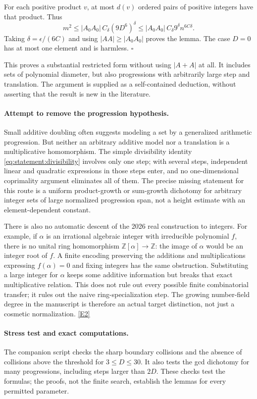 \documentclass[11pt,a4paper]{article}
\newcommand{\Z}{\mathbb{Z}}
\newcommand{\eref}[2]{\hyperlink{extra:#1:#2}{[E#2]}}
\numberwithin{equation}{section}
\begin{document}
For each positive product $v$, at most $d(v)$ ordered pairs of positive
integers have that product. Thus
\[
 m^2\leq |A_0A_0|\,C_\delta(9D^6)^\delta
 \leq |A_0A_0|\,C_\delta9^\delta n^{6C\delta}.
\]
Taking $\delta=\epsilon/(6C)$ and using $|AA|\geq|A_0A_0|$ proves the
lemma. The case $D=0$ has at most one element and is harmless. $\square$

This proves a substantial restricted form without using $|A+A|$ at all.
It includes sets of polynomial diameter, but also progressions with
arbitrarily large step and translation. The argument is supplied as a
self-contained deduction, without asserting that the result is new in
the literature.

\paragraph{Attempt to remove the progression hypothesis.}
Small additive doubling often suggests modeling a set by a generalized
arithmetic progression. But neither an arbitrary additive model nor a
translation is a multiplicative homomorphism. The simple divisibility
identity \eqref{eq:statement:divisibility} involves only one step; with several
steps, independent linear and quadratic expressions in those steps enter,
and no one-dimensional coprimality argument eliminates all of them.
The precise missing statement for this route is a uniform product-growth
or sum-growth dichotomy for arbitrary integer sets of large normalized
progression span, not a height estimate with an element-dependent constant.

There is also no automatic descent of the 2026 real construction to
integers. For example, if $\alpha$ is an irrational algebraic integer with
irreducible polynomial $f$, there is no unital ring homomorphism
$\Z[\alpha]\to\Z$: the image of $\alpha$ would be an integer root of $f$.
A finite encoding preserving the additions and multiplications expressing
$f(\alpha)=0$ and fixing integers has the same obstruction. Substituting
a large integer for $\alpha$ keeps some additive information but breaks
that exact multiplicative relation. This does not rule out every possible
finite combinatorial transfer; it rules out the naive ring-specialization
step. The growing number-field degree in the manuscript is therefore an
actual target distinction, not just a cosmetic normalization.
\eref{statement}{2}

\paragraph{Stress test and exact computations.}
The companion script checks the sharp boundary collisions and the absence
of collisions above the threshold for $3\leq D\leq30$. It also tests the
gcd dichotomy for many progressions, including steps larger than $2D$.
These checks test the formulas; the proofs, not the finite search, establish
the lemmas for every permitted parameter.
\end{document}

